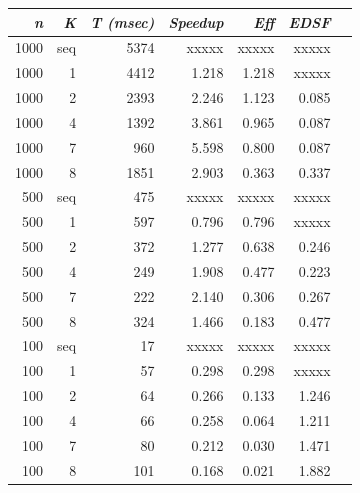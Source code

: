 \documentclass{dependencies/acm_proc_article-sp}
\begin{document}
\begin{center}
\begin{tabular}{|r|r|r|r|r|r|r|}\hline
{\em n} & {\em K} & {\em T (msec)} & {\em Speedup} & {\em Eff} & {\em EDSF} \\\hline
1000    & seq     &  5374          & xxxxx        & xxxxx    & xxxxx     \\\hline
1000    & 1       &  4412          & 1.218        & 1.218    & xxxxx     \\\hline
1000    & 2       &  2393          & 2.246        & 1.123    & 0.085     \\\hline
1000    & 4       &  1392          & 3.861        & 0.965    & 0.087     \\\hline
1000    & 7       &  960           & 5.598        & 0.800    & 0.087     \\\hline
1000    & 8       &  1851          & 2.903        & 0.363    & 0.337     \\\hline
500     & seq     &  475           & xxxxx        & xxxxx    & xxxxx     \\\hline
500     & 1       &  597           & 0.796        & 0.796    & xxxxx     \\\hline
500     & 2       &  372           & 1.277        & 0.638    & 0.246     \\\hline
500     & 4       &  249           & 1.908        & 0.477    & 0.223     \\\hline
500     & 7       &  222           & 2.140        & 0.306    & 0.267     \\\hline
500     & 8       &  324           & 1.466        & 0.183    & 0.477     \\\hline
100     & seq     &  17            & xxxxx        & xxxxx    & xxxxx     \\\hline
100     & 1       &  57            & 0.298        & 0.298    & xxxxx     \\\hline
100     & 2       &  64            & 0.266        & 0.133    & 1.246     \\\hline
100     & 4       &  66            & 0.258        & 0.064    & 1.211     \\\hline
100     & 7       &  80            & 0.212        & 0.030    & 1.471     \\\hline
100     & 8       &  101           & 0.168        & 0.021    & 1.882     \\\hline
\end{tabular}
\end{center}
\end{document}
